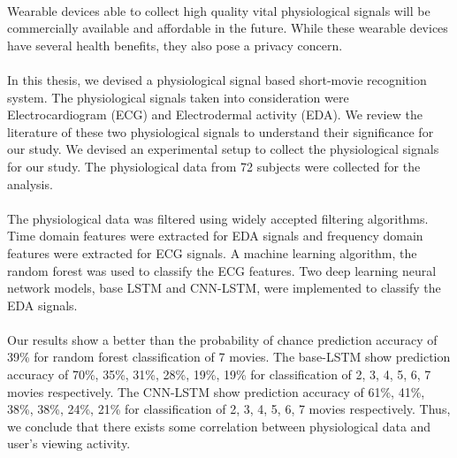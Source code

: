 \paragraph{}
Wearable devices able to collect high quality vital physiological signals will be commercially available and affordable in the future. While these wearable devices have several health benefits, they also pose a privacy concern.
\paragraph{}
In this thesis, we devised a physiological signal based short-movie recognition system. The physiological signals taken into consideration were Electrocardiogram (ECG) and Electrodermal activity (EDA). We review the literature of these two physiological signals to understand their significance for our study. We devised an experimental setup to collect the physiological signals for our study. The physiological data from 72 subjects were collected for the analysis.
\paragraph{}
The physiological data was filtered using widely accepted filtering algorithms. Time domain features were extracted for EDA signals and frequency domain features were extracted for ECG signals. A machine learning algorithm, the random forest was used to classify the ECG features. Two deep learning neural network models, base LSTM and CNN-LSTM, were implemented to classify the EDA signals.
\paragraph{}
Our results show a better than the probability of chance prediction accuracy of 39\% for random forest classification of 7 movies. The base-LSTM show prediction accuracy of 70\%, 35\%, 31\%, 28\%, 19\%, 19\% for classification of 2, 3, 4, 5, 6, 7 movies respectively. The CNN-LSTM show prediction accuracy of 61\%, 41\%, 38\%, 38\%, 24\%, 21\%  for classification of 2, 3, 4, 5, 6, 7 movies respectively. Thus, we conclude that there exists some correlation between physiological data and user's viewing activity. 